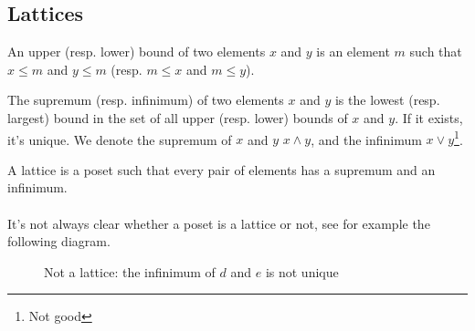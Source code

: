   \subsection{Lattices}

  \begin{definition}
    An upper (resp. lower) bound of two elements $x$ and $y$ is an element $m$ such that $x \le m$ and $y \le m$ (resp. $m \le x$ and $m \le y$).
  \end{definition}

  \begin{definition}
    The supremum (resp. infinimum) of two elements $x$ and $y$ is the lowest (resp. largest) bound in the set of all upper (resp. lower) bounds of $x$ and $y$. If it exists, it's unique. We denote the supremum of $x$ and $y$ $x \wedge y$, and the infinimum $ x \vee y$\footnote{Not good}.
  \end{definition}

  \begin{definition}[Lattice]
    A lattice is a poset such that every pair of elements has a supremum and an infinimum.
  \end{definition}

  \paragraph{}
  It's not always clear whether a poset is a lattice or not, see for example the following diagram.

  \begin{figure}[H]
    \begin{center}
      \caption{Not a lattice: the infinimum of $d$ and $e$ is not unique}
    \end{center}
  \end{figure}
